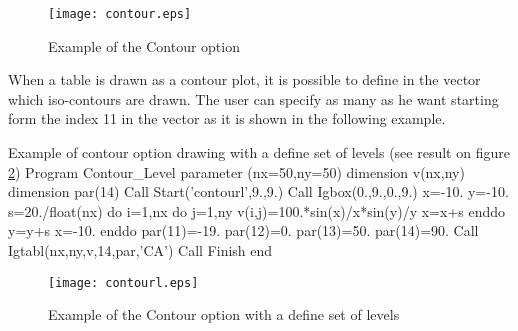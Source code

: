 \vfill
\clearpage

\begin{figure}[p]
\begin{center} \texttt{[image: contour.eps]} \end{center}
\caption{Example of the \protect{} Contour option}
\label{CONTOUR}
\end{figure}

\vfill
\clearpage

When a table is drawn as a contour plot, it is possible to define
in the  vector which iso-contours are drawn. The user can
specify as many as he want starting form the index 11 in the vector
 as it is shown in the following example.

\bigskip

\begin{XMPt}{Example of contour option drawing with a define set of levels 
             (see result on figure \ref{CONTOURL})}
      Program Contour_Level
      parameter (nx=50,ny=50)
      dimension v(nx,ny)
      dimension par(14)
      Call Start('contourl',9.,9.)
      Call Igbox(0.,9.,0.,9.)
      x=-10.
      y=-10.
      s=20./float(nx)
      do i=1,nx
         do j=1,ny
            v(i,j)=100.*sin(x)/x*sin(y)/y
            x=x+s
         enddo
         y=y+s
         x=-10.
      enddo
      par(11)=-19.
      par(12)=0.
      par(13)=50.
      par(14)=90.
      Call Igtabl(nx,ny,v,14,par,'CA')
      Call Finish
      end
\end{XMPt}

\vfill
\clearpage

\begin{figure}[p]
\begin{center} \texttt{[image: contourl.eps]} \end{center}
\caption{Example of the \protect{} Contour option with a define set of levels}
\label{CONTOURL}
\end{figure}

\vfill
\clearpage

